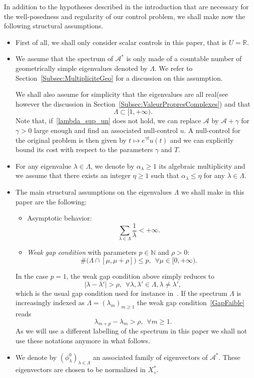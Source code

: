 \documentclass[10pt]{amsart}
\theoremstyle{definition}\newtheorem{defi}[theo]{Definition}\newtheorem{rema}[theo]{Remark}\newtheorem{exam}[theo]{Example}\newtheorem{exem}[theo]{Example}\newtheorem{nota}[theo]{Notation}
\newcommand\A{\mathcal{A}}
\newcommand\As{\mathcal{A}^*}
\newcommand{\Xalphas}{X_\diamond^*}
\newcommand{\N}{\mathbb{N}}
\newcommand{\R}{\mathbb{R}}
\let\oldforall\forall
\renewcommand*{\forall}{\mathrel{\oldforall}}
\begin{document}
In addition to the hypotheses described in the introduction that are necessary for the well-posedness and regularity of our control problem, we shall make now the following structural assumptions.
\begin{itemize}
\item First of all, we shall only consider scalar controls in this paper, that is $U=\R$.
\item We assume that the spectrum of $\As$ is only made of a countable number of geometrically simple eigenvalues denoted by $\Lambda$. We refer to Section~\ref{Subsec:MultipliciteGeo} for a discussion on this assumption.

We shall also assume for simplicity that the eigenvalues are all real\linebreak(see however the discussion in Section~\ref{Subsec:ValeurPropresComplexes}) and that
\begin{equation}\label{lambda_sup_un}
\Lambda\subset[1,+\infty).
\end{equation}
Note that, if~\eqref{lambda_sup_un} does not hold, we can replace $\A$ by $\A+\gamma$ for $\gamma>0$ large enough and find an associated null-control $u$. A null-control for the original problem is then given by $t\mapsto e^{\gamma t} u(t)$ and we can explicitly bound its cost with respect to the parameters $\gamma$ and $T$.
\item For any eigenvalue $\lambda \in \Lambda$, we denote by $\alpha_\lambda \geq 1$ its algebraic multiplicity and we assume that there exists an integer $\eta \geq 1$ such that $\alpha_\lambda\leq \eta$ for any $\lambda\in \Lambda$.
\item The main structural assumptions on the eigenvalues $\Lambda$ we shall make in this paper are the following:
\begin{itemize}
\item Asymptotic behavior:
\begin{equation}\label{SommabiliteVP}
\sum_{\lambda\in \Lambda} \frac{1}{\lambda} < +\infty.
\end{equation}
\item \emph{Weak gap condition} with parameters $p\in \N$ and $\rho>0$:
\begin{equation}\label{GapFaible}
\# \bigg(\Lambda \cap [\mu,\mu+\rho] \bigg) \leq p, \ \ \forall \mu\in [0,+\infty).
\end{equation}
\end{itemize}
In the case $p=1$, the weak gap condition above simply reduces to
\[
|\lambda-\lambda'|> \rho, \ \ \forall \lambda,\lambda'\in \Lambda, \lambda\neq\lambda',
\]
which is the usual gap condition used for instance in~\cite{FattoriniRussell71}. If the spectrum $\Lambda$ is increasingly indexed as $\Lambda= (\lambda_m)_{m \geq 1}$ the weak gap condition~\eqref{GapFaible} reads
\[
\lambda_{m+p}-\lambda_m > \rho, \ \ \forall m \geq 1.
\]
As we will use a different labelling of the spectrum in this paper we shall not use these notations anymore in what follows.
\item We denote by $(\phi_\lambda^0)_{\lambda\in \Lambda}$ an associated family of eigenvectors of $\As$. These eigenvectors are chosen to be normalized in $\Xalphas$.


\end{itemize}
\end{document}
